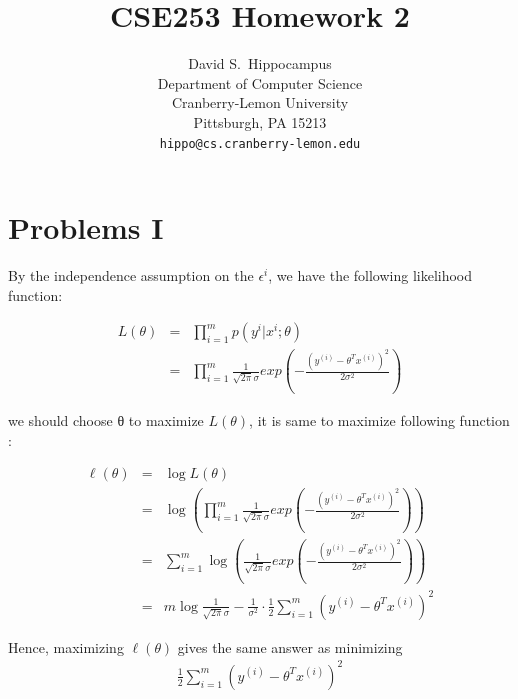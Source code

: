 \documentclass{article} %
\title{CSE253 Homework 2}
\author{
David S.~Hippocampus\\
Department of Computer Science\\
Cranberry-Lemon University\\
Pittsburgh, PA 15213 \\
\texttt{hippo@cs.cranberry-lemon.edu}
}
\begin{document}
\maketitle


\section{Problems I}


By the independence assumption on the $\epsilon^{i}$, we have the following likelihood function:



\begin{equation}
    \begin{array}{rcl}
       L(\theta) & = &  \prod\limits_{i = 1}^{m} p(y^{i} | x^{i} ; \theta)  \\
       & = &  \prod\limits_{i = 1}^{m} \frac{1}{\sqrt{2\pi} \sigma} exp(- \frac{(y^{(i)}   -   \theta^Tx^{(i)}  ) ^ 2}{2\sigma^2})
    \end{array}
\end{equation}

we should choose θ to maximize $L(\theta)$, it is same to maximize following function :

\begin{equation}
    \begin{array}{rcl}
       \ell(\theta) & = & \log{L(\theta)} \\
       & = &  \log {(\prod\limits_{i = 1}^{m} \frac{1}{\sqrt{2\pi} \sigma} exp(- \frac{(y^{(i)}   -   \theta^Tx^{(i)}  ) ^ 2}{2\sigma^2}))} \\
       & = & \sum\limits_{i = 1}^{m} \log {(\frac{1}{\sqrt{2\pi} \sigma} exp(- \frac{(y^{(i)}   -   \theta^Tx^{(i)}  ) ^ 2}{2\sigma^2}))} \\
       & = & m \log{ \frac{1}{\sqrt{2\pi} \sigma}  } - \frac{1}{\sigma^2} \cdot \frac{1}{2} \sum\limits_{i=1}^{m}(   y^{(i)}   -   \theta^Tx^{(i)}   )^2
    \end{array}
\end{equation}

Hence, maximizing $\ell(\theta)$ gives the same answer as minimizing \\

\begin{equation}
    \begin{array}{rcl}
       \frac{1}{2} \sum\limits_{i=1}^{m}(   y^{(i)}   -   \theta^Tx^{(i)}   )^2
    \end{array}
\end{equation}
\end{document}
